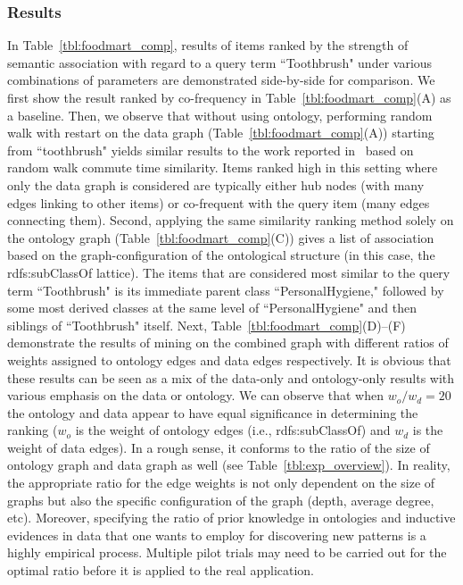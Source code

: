 \subsubsection{Results}
In Table~\ref{tbl:foodmart_comp}, results of items ranked by the strength of semantic association with regard to a query term ``Toothbrush" under various combinations of parameters are demonstrated side-by-side for comparison. We first show the result ranked by co-frequency in Table~\ref{tbl:foodmart_comp}(A) as a baseline. Then, we observe that without using ontology, performing random walk with restart on the data graph (Table~\ref{tbl:foodmart_comp}(A)) starting from ``toothbrush" yields similar results to the work reported in~\cite{LiuEtal11} based on random walk commute time similarity. Items ranked high in this setting where only the data graph is considered are typically either hub nodes (with many edges linking to other items) or co-frequent with the query item (many edges connecting them). Second, applying the same similarity ranking method solely on the ontology graph (Table~\ref{tbl:foodmart_comp}(C)) gives a list of association based on the graph-configuration of the ontological structure (in this case, the rdfs:subClassOf lattice). The items that are considered most similar to the query term ``Toothbrush" is its immediate parent class ``PersonalHygiene," followed by some most derived classes at the same level of ``PersonalHygiene" and then siblings of ``Toothbrush" itself. Next, Table~\ref{tbl:foodmart_comp}(D)--(F) demonstrate the results of mining on the combined graph with different ratios of weights assigned to ontology edges and data edges respectively. It is obvious that these results can be seen as a mix of the data-only and ontology-only results with various emphasis on the data or ontology. We can observe that when $w_o/w_d=20$ the ontology and data appear to have equal significance in determining the ranking ($w_o$ is the weight of ontology edges (i.e., rdfs:subClassOf) and $w_d$ is the weight of data edges). In a rough sense, it conforms to the ratio of the size of ontology graph and data graph as well (see Table~\ref{tbl:exp_overview}). In reality, the appropriate ratio for the edge weights is not only dependent on the size of graphs but also the specific configuration of the graph (depth, average degree, etc). Moreover, specifying the ratio of prior knowledge in ontologies and inductive evidences in data that one wants to employ for discovering new patterns is a highly empirical process. Multiple pilot trials may need to be carried out for the optimal ratio before it is applied to the real application.

